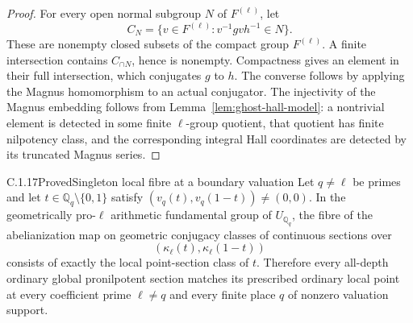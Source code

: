 \begin{proof}
For every open normal subgroup \(N\) of
\(F^{(\ell)}\), let
\[
 C_N=\{v\in F^{(\ell)}:v^{-1}gvh^{-1}\in N\}.
\]
These are nonempty closed subsets of the compact
group \(F^{(\ell)}\). A finite intersection contains
\(C_{\cap N}\), hence is nonempty. Compactness gives
an element in their full intersection, which conjugates
\(g\) to \(h\). The converse follows by applying the
Magnus homomorphism to an actual conjugator. The
injectivity of the Magnus embedding follows from
Lemma~\ref{lem:ghost-hall-model}: a nontrivial element
is detected in some finite \(\ell\)-group quotient,
that quotient has finite nilpotency class, and the
corresponding integral Hall coordinates are detected
by its truncated Magnus series.
\end{proof}

\begin{result}{C.1.17}{Proved}{Singleton local fibre at a boundary valuation}
\label{prop:ghost-local-boundary}
Let \(q\ne\ell\) be primes and let
\(t\in\mathbb Q_q\setminus\{0,1\}\) satisfy
\((v_q(t),v_q(1-t))\ne(0,0)\). In the geometrically
pro-\(\ell\) arithmetic fundamental group of
\(U_{\mathbb Q_q}\), the fibre of the abelianization
map on geometric conjugacy classes of continuous
sections over
\[
             (\kappa_\ell(t),\kappa_\ell(1-t))
\]
consists of exactly the local point-section class of
\(t\). Therefore every all-depth ordinary global
pronilpotent section matches its prescribed ordinary
local point at every coefficient prime \(\ell\ne q\)
and every finite place \(q\) of nonzero valuation
support.
\end{result}
